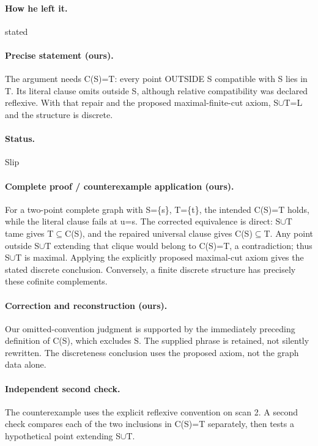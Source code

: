 \paragraph{How he left it.} stated

\paragraph{Precise statement (ours).} The argument needs C(S)=T: every point OUTSIDE S compatible with S lies in T. Its literal clause omits outside S, although relative compatibility was declared reflexive. With that repair and the proposed maximal-finite-cut axiom, S\ensuremath{\cup}T=L and the structure is discrete.

\paragraph{Status.} Slip

\paragraph{Complete proof / counterexample application (ours).} For a two-point complete graph with S=\{s\}, T=\{t\}, the intended C(S)=T holds, while the literal clause fails at u=s. The corrected equivalence is direct: S\ensuremath{\cup}T tame gives T\ensuremath{\subseteq}C(S), and the repaired universal clause gives C(S)\ensuremath{\subseteq}T. Any point outside S\ensuremath{\cup}T extending that clique would belong to C(S)=T, a contradiction; thus S\ensuremath{\cup}T is maximal. Applying the explicitly proposed maximal-cut axiom gives the stated discrete conclusion. Conversely, a finite discrete structure has precisely these cofinite complements.

\paragraph{Correction and reconstruction (ours).} Our omitted-convention judgment is supported by the immediately preceding definition of C(S), which excludes S. The supplied phrase is retained, not silently rewritten. The discreteness conclusion uses the proposed axiom, not the graph data alone.

\paragraph{Independent second check.} The counterexample uses the explicit reflexive convention on scan 2. A second check compares each of the two inclusions in C(S)=T separately, then tests a hypothetical point extending S\ensuremath{\cup}T.


